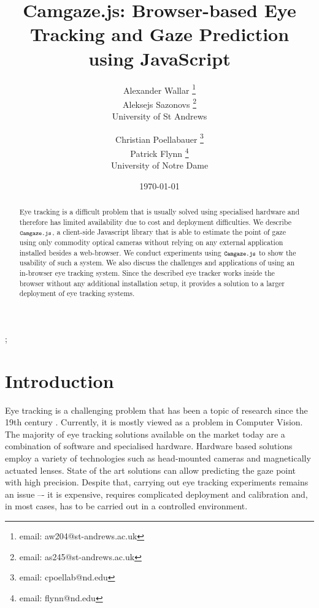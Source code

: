 \documentclass[annual]{acmsiggraph}
\title{Camgaze.js: Browser-based Eye Tracking and Gaze Prediction using
JavaScript}
\author{Alexander Wallar \thanks{email: aw204@st-andrews.ac.uk} \\ Aleksejs
Sazonovs \thanks{email: as245@st-andrews.ac.uk} \\ University of St Andrews
\and Christian Poellabauer \thanks{email: cpoellab@nd.edu} \\ Patrick Flynn
\thanks{email: flynn@nd.edu} \\ University of Notre Dame}
\date{\today}
\newcommand{\Acronym}[1]{\ensuremath{{\small{\texttt{#1}}}}}
\newcommand{\Name}{\Acronym{Camgaze.js}} \newcommand{\False}{\Constant{false}}
\newcommand{\Constant}[1]{\ensuremath{\small{\texttt{#1}}}}
\begin{document}
\maketitle

\begin{abstract}

Eye tracking is a difficult problem that is usually solved using specialised
hardware and therefore has limited availability due to cost and deployment
difficulties. We describe $\Name$, a client-side Javascript library that is
able to estimate the point of gaze using only commodity optical cameras without
relying on any external application installed besides a web-browser. We conduct
experiments using $\Name$ to show the usability of such a system.  We also
discuss the challenges and applications of using an in-browser eye tracking
system. Since the described eye tracker works inside the browser without any
additional installation setup, it provides a solution to a larger deployment of
eye tracking systems.

\end{abstract}

\begin{CRcatlist} ;

\end{CRcatlist}

\keywordlist


\copyrightspace

\section{Introduction}

Eye tracking is a challenging problem that has been a topic of research
since the 19th century \cite{Wade2010}. Currently, it is mostly viewed as a
problem in Computer Vision. The majority of eye tracking solutions available on
the market today are a combination of software and specialised hardware.
Hardware based solutions employ a variety of technologies such as head-mounted
cameras and magnetically actuated lenses. State of the art solutions can allow
predicting the gaze point with high precision.  Despite that, carrying out eye
tracking experiments remains an issue –- it is expensive, requires complicated
deployment and calibration and, in most cases, has to be carried out in a
controlled environment.
\end{document}
